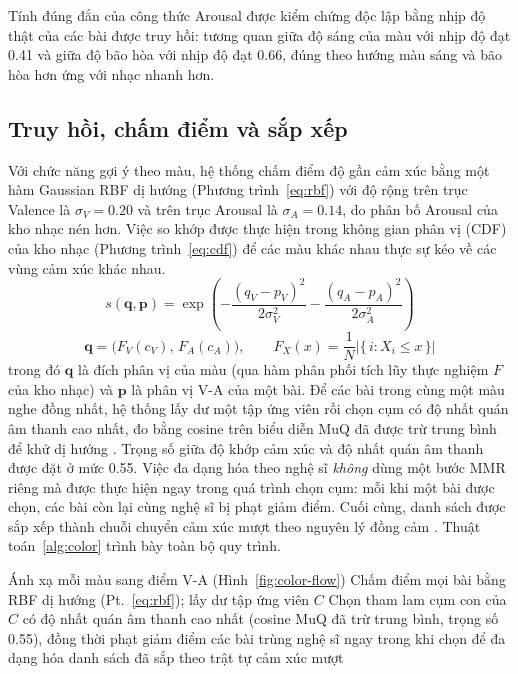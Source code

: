 \documentclass[../DoAn.tex]{subfiles}
\begin{document}
Tính đúng đắn của công thức Arousal được kiểm chứng độc lập bằng nhịp độ thật của các bài được truy hồi: tương quan giữa độ sáng của màu với nhịp độ đạt 0.41 và giữa độ bão hòa với nhịp độ đạt 0.66, đúng theo hướng màu sáng và bão hòa hơn ứng với nhạc nhanh hơn.

\subsection{Truy hồi, chấm điểm và sắp xếp}
\label{subsection:4.2.3}
Với chức năng gợi ý theo màu, hệ thống chấm điểm độ gần cảm xúc bằng một hàm Gaussian RBF dị hướng (Phương trình~\eqref{eq:rbf}) với độ rộng trên trục Valence là $\sigma_V = 0.20$ và trên trục Arousal là $\sigma_A = 0.14$, do phân bố Arousal của kho nhạc nén hơn. Việc so khớp được thực hiện trong không gian phân vị (CDF) của kho nhạc (Phương trình~\eqref{eq:cdf}) để các màu khác nhau thực sự kéo về các vùng cảm xúc khác nhau.
\begin{equation}\label{eq:rbf}
    s(\mathbf{q}, \mathbf{p}) = \exp\!\left(-\frac{(q_V - p_V)^2}{2\sigma_V^2} - \frac{(q_A - p_A)^2}{2\sigma_A^2}\right)
\end{equation}
\begin{equation}\label{eq:cdf}
    \mathbf{q} = \big(F_V(c_V),\, F_A(c_A)\big), \qquad
    F_X(x) = \frac{1}{N}\big|\{\, i : X_i \le x \,\}\big|
\end{equation}
trong đó $\mathbf{q}$ là đích phân vị của màu (qua hàm phân phối tích lũy thực nghiệm $F$ của kho nhạc) và $\mathbf{p}$ là phân vị V-A của một bài. Để các bài trong cùng một màu nghe đồng nhất, hệ thống lấy dư một tập ứng viên rồi chọn cụm có độ nhất quán âm thanh cao nhất, đo bằng cosine trên biểu diễn MuQ đã được trừ trung bình để khử dị hướng \cite{ethayarajh2019anisotropy, mu2018allbutthetop}. Trọng số giữa độ khớp cảm xúc và độ nhất quán âm thanh được đặt ở mức 0.55. Việc đa dạng hóa theo nghệ sĩ \textit{không} dùng một bước MMR riêng mà được thực hiện ngay trong quá trình chọn cụm: mỗi khi một bài được chọn, các bài còn lại cùng nghệ sĩ bị phạt giảm điểm. Cuối cùng, danh sách được sắp xếp thành chuỗi chuyển cảm xúc mượt theo nguyên lý đồng cảm \cite{starcke2021iso}. Thuật toán~\ref{alg:color} trình bày toàn bộ quy trình.

\begin{algorithm}[h]
\caption{Gợi ý playlist theo màu}
\label{alg:color}
Ánh xạ mỗi màu sang điểm V-A (Hình~\ref{fig:color-flow})\;
Chấm điểm mọi bài bằng RBF dị hướng (Pt.~\eqref{eq:rbf}); lấy dư tập ứng viên $C$\;
Chọn tham lam cụm con của $C$ có độ nhất quán âm thanh cao nhất (cosine MuQ đã trừ trung bình, trọng số 0.55), đồng thời phạt giảm điểm các bài trùng nghệ sĩ ngay trong khi chọn để đa dạng hóa\;
\Return danh sách đã sắp theo trật tự cảm xúc mượt\;
\end{algorithm}
\end{document}
